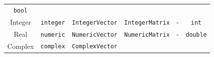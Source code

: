 \documentclass[]{book}
\begin{document}
\begin{longtable}[]{@{}cccccc@{}}
\begin{minipage}[t]{0.14\columnwidth}
\texttt{bool}\strut
\end{minipage}\tabularnewline
\begin{minipage}[t]{0.14\columnwidth}\centering
Integer\strut
\end{minipage} & \begin{minipage}[t]{0.14\columnwidth}\centering
\texttt{integer}\strut
\end{minipage} & \begin{minipage}[t]{0.14\columnwidth}\centering
\texttt{IntegerVector}\strut
\end{minipage} & \begin{minipage}[t]{0.14\columnwidth}\centering
\texttt{IntegerMatrix}\strut
\end{minipage} & \begin{minipage}[t]{0.14\columnwidth}\centering
-\strut
\end{minipage} & \begin{minipage}[t]{0.14\columnwidth}\centering
\texttt{int}\strut
\end{minipage}\tabularnewline
\begin{minipage}[t]{0.14\columnwidth}\centering
Real\strut
\end{minipage} & \begin{minipage}[t]{0.14\columnwidth}\centering
\texttt{numeric}\strut
\end{minipage} & \begin{minipage}[t]{0.14\columnwidth}\centering
\texttt{NumericVector}\strut
\end{minipage} & \begin{minipage}[t]{0.14\columnwidth}\centering
\texttt{NumericMatrix}\strut
\end{minipage} & \begin{minipage}[t]{0.14\columnwidth}\centering
-\strut
\end{minipage} & \begin{minipage}[t]{0.14\columnwidth}\centering
\texttt{double}\strut
\end{minipage}\tabularnewline
\begin{minipage}[t]{0.14\columnwidth}\centering
Complex\strut
\end{minipage} & \begin{minipage}[t]{0.14\columnwidth}\centering
\texttt{complex}\strut
\end{minipage} & \begin{minipage}[t]{0.14\columnwidth}\centering
\texttt{ComplexVector}\strut
\end{minipage} & \begin{minipage}[t]{0.14\columnwidth}\centering

\end{minipage}
\end{longtable}
\end{document}

